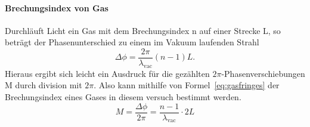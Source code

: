 \paragraph{Brechungsindex von Gas}
Durchläuft Licht ein Gas mit dem Brechungsindex n auf einer 
Strecke L, so beträgt der Phasenunterschied zu einem im Vakuum 
laufenden Strahl
\begin{equation}
\Delta\phi = \frac{2\pi}{\lambda_\text{vac}}(n-1)L.
\end{equation}
Hieraus ergibt sich leicht ein Ausdruck für die gezählten 
$2\pi$-Phasenverschiebungen M durch division mit $2\pi$.
Also kann mithilfe von Formel~\eqref{eq:gasfringes} der 
Brechungsindex eines Gases in diesem versuch bestimmt werden.
\begin{equation}
M = \frac{\Delta\phi}{2\pi} = \frac{n-1}{\lambda_\text{vac}}\cdot 2L
\label{eq:gasfringes}
\end{equation}
